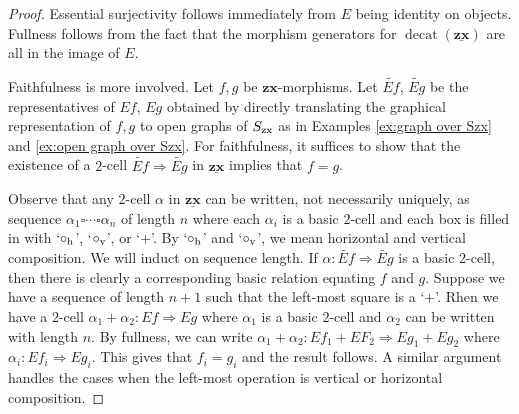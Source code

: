 \documentclass[11pt]{amsart}
\theoremstyle{definition}
\begin{document}
\begin{proof}
	Essential surjectivity follows immediately from $E$ being identity on objects.  Fullness follows from the fact that the morphism generators for $\operatorname{decat}(\underline{\mathbf{zx}})$ are all in the image of $E$. 
	
	Faithfulness is more involved. Let $f,g$ be $\mathbf{zx}$-morphisms. Let $\widetilde{Ef}$, $\widetilde{Eg}$ be the representatives of $Ef$, $Eg$ obtained by directly translating the graphical representation of $f,g$ to open graphs of $S_{\textup{zx}}$ as in Examples \ref{ex:graph over Szx}  and \ref{ex:open graph over Szx}. For faithfulness, it suffices to show that the existence of a $2$-cell $\widetilde{Ef} \Rightarrow \widetilde{Eg}$ in $\underline{\mathbf{zx}}$ implies that $f=g$.  
	
	Observe that any $2$-cell $\alpha$ in $\underline{\mathbf{zx}}$ can be written, not necessarily uniquely, as sequence $\alpha_1 \square \dotsm \square \alpha_n$ of length $n$ where each $\alpha_i$ is a basic $2$-cell and each box is filled in with `$\circ_\textup{h}$', `$\circ_\textup{v}$', or `$+$'. By `$\circ_\textup{h}$' and `$\circ_\textup{v}$', we mean horizontal and vertical composition. We will induct on sequence length.  If $\alpha \colon \widetilde{Ef} \Rightarrow \widetilde{Eg}$ is a basic $2$-cell, then there is clearly a corresponding basic relation equating $f$ and $g$.  Suppose we have a sequence of length $n+1$ such that the left-most square is a `$+$'. Rhen we have a $2$-cell $\alpha_1 + \alpha_2 \colon Ef \Rightarrow Eg$ where $\alpha_1$ is a basic $2$-cell and $\alpha_2$ can be written with length $n$.   By fullness, we can write $\alpha_1 + \alpha_2 \colon Ef_1 + EF_2 \Rightarrow Eg_1 + Eg_2$ where $\alpha_i \colon Ef_i \Rightarrow Eg_i$.   This gives that $f_i = g_i$  and the result follows.  A similar argument handles the cases when the left-most operation is vertical or horizontal composition.
\end{proof}

%
%
\end{document}
